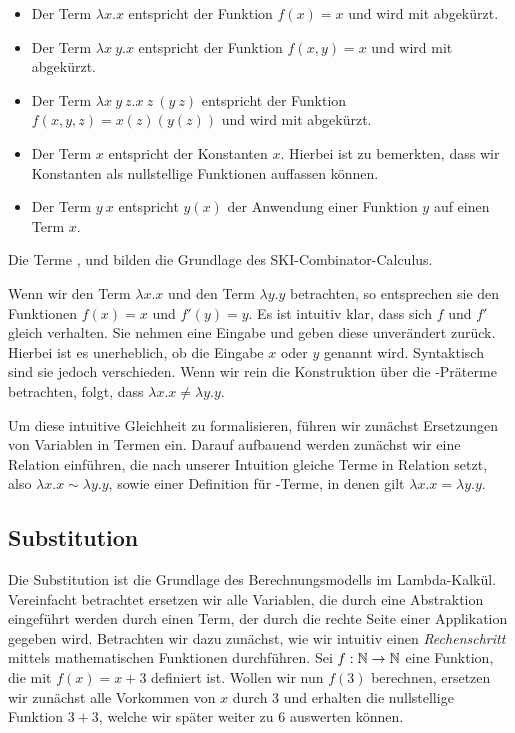 \begin{example}{}{}
\begin{itemize}
    \item Der Term $\lambda x.x$ entspricht der Funktion $f(x)=x$ und wird mit \tI{} abgekürzt.
    \item Der Term $\lambda x~y.x$ entspricht der Funktion $f(x, y)=x$ und wird mit \tK{} abgekürzt.
    \item Der Term $\lambda x~y~z.x~z~(y~z)$ entspricht der Funktion $f(x, y, z) = x(z)(y(z))$ und wird mit \tS{} abgekürzt.
    \item Der Term $x$ entspricht der Konstanten $x$. Hierbei ist zu bemerkten, dass wir Konstanten als nullstellige Funktionen auffassen können.
    \item Der Term $y~x$ entspricht $y(x)$ der Anwendung einer Funktion $y$ auf einen Term $x$.
\end{itemize}
\end{example}
\begin{remark}
    Die Terme \tS,\tK{} und \tI{} bilden die Grundlage des SKI-Combinator-Calculus.\cite{Schoenfinkel1924}    
\end{remark}

Wenn wir den Term $\lambda x.x$ und den Term $\lambda y.y$ betrachten, so entsprechen sie den Funktionen $f(x)=x$ und $f'(y)= y$. Es ist intuitiv klar, dass sich $f$ und $f'$ gleich verhalten. Sie nehmen eine Eingabe und geben diese unverändert zurück. Hierbei ist es unerheblich, ob die Eingabe $x$ oder $y$ genannt wird. Syntaktisch sind sie jedoch verschieden. Wenn wir rein die Konstruktion über die \tlambda-Präterme betrachten, folgt, dass $\lambda x.x \neq \lambda y.y$. 

Um diese intuitive Gleichheit zu formalisieren, führen wir zunächst Ersetzungen von Variablen in Termen ein. Darauf aufbauend werden zunächst wir eine Relation einführen, die nach unserer Intuition gleiche Terme in Relation setzt, also $\lambda x.x \sim \lambda y.y$, sowie einer Definition für \tlambda-Terme, in denen gilt $\lambda x.x = \lambda y.y$.
    
\subsection{Substitution}

Die Substitution ist die Grundlage des Berechnungsmodells im Lambda-Kalkül. Vereinfacht betrachtet ersetzen wir alle Variablen, die durch eine Abstraktion eingeführt werden durch einen Term, der durch die rechte Seite einer Applikation gegeben wird. Betrachten wir dazu zunächst, wie wir intuitiv einen \emph{Rechenschritt} mittels mathematischen Funktionen durchführen. Sei $f : \mathbb{N}\to\mathbb{N}$ eine Funktion, die mit $f(x) = x + 3$ definiert ist. Wollen wir nun $f(3)$ berechnen, ersetzen wir zunächst alle Vorkommen von $x$ durch $3$ und erhalten die nullstellige Funktion $3 + 3$, welche wir später weiter zu $6$ auswerten können.

